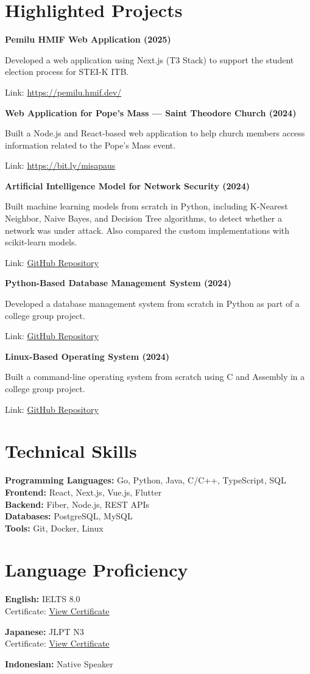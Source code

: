 \documentclass[11pt,a4paper]{article}
\newcommand{\project}[3]{%
  \Needspace{4\baselineskip}%
  \textbf{#1}\par #2\par Link: #3\par\vspace{6pt}}
\begin{document}
\section*{Highlighted Projects}
\project{Pemilu HMIF Web Application (2025)}
{Developed a web application using Next.js (T3 Stack) to support the student election process for STEI-K ITB.}
{\url{https://pemilu.hmif.dev/}}
\project{Web Application for Pope's Mass --- Saint Theodore Church (2024)}
{Built a Node.js and React-based web application to help church members access information related to the Pope's Mass event.}
{\url{https://bit.ly/misapaus}}
\project{Artificial Intelligence Model for Network Security (2024)}
{Built machine learning models from scratch in Python, including K-Nearest Neighbor, Naive Bayes, and Decision Tree algorithms, to detect whether a network was under attack. Also compared the custom implementations with scikit-learn models.}
{\href{https://github.com/CrystalNoob/Tubes2_AI/}{GitHub Repository}}
\project{Python-Based Database Management System (2024)}
{Developed a database management system from scratch in Python as part of a college group project.}
{\href{https://github.com/zultopia/Tubes-SBD-MarioDB}{GitHub Repository}}
\project{Linux-Based Operating System (2024)}
{Built a command-line operating system from scratch using C and Assembly in a college group project.}
{\href{https://github.com/labsister21/os-2024-michaelsoftbinbows}{GitHub Repository}}

\section*{Technical Skills}
\textbf{Programming Languages:} Go, Python, Java, C/C++, TypeScript, SQL\\
\textbf{Frontend:} React, Next.js, Vue.js, Flutter\\
\textbf{Backend:} Fiber, Node.js, REST APIs\\
\textbf{Databases:} PostgreSQL, MySQL\\
\textbf{Tools:} Git, Docker, Linux

\section*{Language Proficiency}
\textbf{English:} IELTS 8.0\\
{\small Certificate: \href{https://drive.google.com/file/d/1WDIrRbLTyx0nKIVyo185zyAxPr9DwWfj/view?usp=sharing}{View Certificate}}\par\vspace{5pt}
\textbf{Japanese:} JLPT N3\\
{\small Certificate: \href{https://drive.google.com/file/d/1UvUr-HtC_kHgTHpfj055hOPcRCTkDKVO/view?usp=sharing}{View Certificate}}\par\vspace{5pt}
\textbf{Indonesian:} Native Speaker
\end{document}
